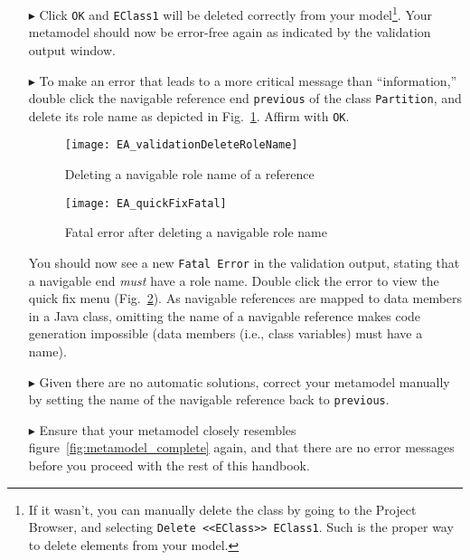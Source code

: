 \begin{enumerate}
\item[$\blacktriangleright$] Click \texttt{OK} and \texttt{EClass1} will be deleted correctly from your model\footnote{If it wasn't, you can manually delete the
class by going to the Project Browser, and selecting \texttt{Delete <<EClass>> EClass1}. Such is the proper way to delete elements from your model.}. Your
metamodel should now be error-free again as indicated by the validation output window.

\item[$\blacktriangleright$] To make an error that leads to a more critical message than ``information,'' double click the navigable reference end
\texttt{previous} of the class \texttt{Partition}, and delete its role name as depicted in Fig.~\ref{fig:delete-role-name}. Affirm with \texttt{OK}.

\begin{figure}[htbp]
    \centering
  \texttt{[image: EA\_validationDeleteRoleName]}
    \caption{Deleting a navigable role name of a reference}
    \label{fig:delete-role-name}
\end{figure}


\begin{figure}[htbp]
	\centering
  \texttt{[image: EA\_quickFixFatal]}
	\caption{Fatal error after deleting a navigable role name}
	\label{fig:fatal-error}
\end{figure}

You should now see a new \texttt{Fatal Error} in the validation output, stating that a navigable end \emph{must} have a role name. Double click the error to
view the quick fix menu (Fig.~\ref{fig:fatal-error}). As navigable references are mapped to data members in a Java class, omitting the name of a navigable
reference makes code generation impossible (data members (i.e., class variables) must have a name).

\item[$\blacktriangleright$] Given there are no automatic solutions, correct your metamodel manually by setting the name of the navigable reference back to
\texttt{previous}.

\item[$\blacktriangleright$] Ensure that your metamodel closely resembles figure~\ref{fig:metamodel_complete} again, and that there are no error messages before
you proceed with the rest of this handbook.
\end{enumerate}


